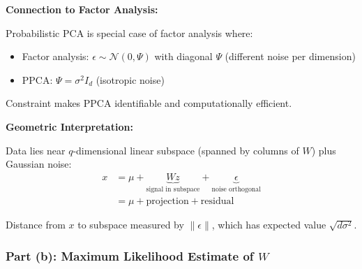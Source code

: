 \documentclass[12pt]{article}
\begin{document}
\begin{explanation}
\textbf{Connection to Factor Analysis:}

Probabilistic PCA is special case of factor analysis where:
\begin{itemize}
    \item Factor analysis: $\epsilon \sim \mathcal{N}(0, \Psi)$ with diagonal $\Psi$ (different noise per dimension)
    \item PPCA: $\Psi = \sigma^2 I_d$ (isotropic noise)
\end{itemize}

Constraint makes PPCA identifiable and computationally efficient.

\textbf{Geometric Interpretation:}

Data lies near $q$-dimensional linear subspace (spanned by columns of $W$) plus Gaussian noise:
\begin{align*}
x &= \mu + \underbrace{Wz}_{\text{signal in subspace}} + \underbrace{\epsilon}_{\text{noise orthogonal}} \\
&= \mu + \text{projection} + \text{residual}
\end{align*}

Distance from $x$ to subspace measured by $\|\epsilon\|$, which has expected value $\sqrt{d\sigma^2}$.

\end{explanation}

\subsubsection{Part (b): Maximum Likelihood Estimate of $W$}
\end{document}
